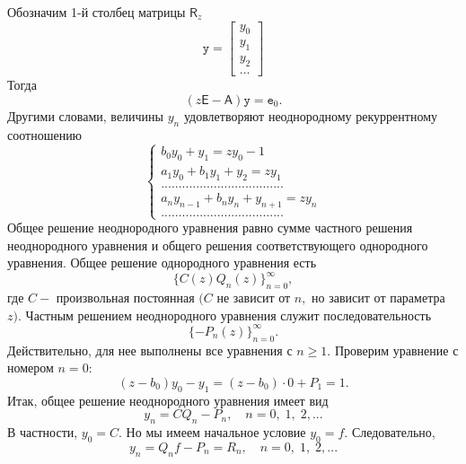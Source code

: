 \documentclass[12pt,a4paper]{article}
\theoremstyle{plain}   \newtheorem{Pro}{Задача}
\begin{document}
Обозначим 1-й столбец матрицы
$ \mathsf{R}_z $
\begin{equation*}
  \mathtt{y}=
    \begin{bmatrix}
	  y_0 \\
	  y_1 \\
	  y_2 \\
	  \dots
	\end{bmatrix}
\end{equation*}
Тогда
$$
  (z \mathsf{E} - \mathsf{A} ) \mathtt{y}= \mathtt{e}_0 .
$$
Другими словами, величины
$ y_n $
удовлетворяют неоднородному рекуррентному соотношению
\begin{equation*}
  \begin{cases}
    b_0 y_0 + y_1 =z y_0 -1 \\
	a_1 y_0 + b_1 y_1 + y_2 =z y_1 \\
	...................................\\
	a_n y_{n-1}+b_n y_n +y_{n+1}=zy_n \\
	...................................
  \end{cases}
\end{equation*}
Общее решение неоднородного уравнения равно сумме
частного решения неоднородного уравнения и
общего решения соответствующего однородного уравнения.
Общее решение однородного уравнения есть
$$
  \{ C(z) Q_n (z) \} _{n=0}^{\infty},
$$
где
$ C - $
произвольная постоянная
$ ( C $
не зависит от
$ n ,$
но зависит от параметра
$ z ). $
Частным решением неоднородного уравнения служит последовательность
$$
 \{ - P_n (z) \} _{n=0}^{\infty}.
$$
Действительно, для нее выполнены все уравнения с
$ n \geq 1. $
Проверим уравнение с номером
$ n=0: $
$$
  (z-b_0 )y_0 -y_1 =(z-b_0 ) \cdot 0 + P_1 =1.
$$
Итак, общее решение неоднородного уравнения имеет вид
$$
  y_n =CQ_n -P_n , \quad n=0, \; 1, \; 2,...
$$
В частности,
$ y_0 =C. $
Но мы имеем начальное условие
$ y_0 =f . $
Следовательно,
$$
  y_n =Q_n f - P_n = R_n ,
  \quad n=0, \; 1, \; 2,...
$$
\\
\end{document}
